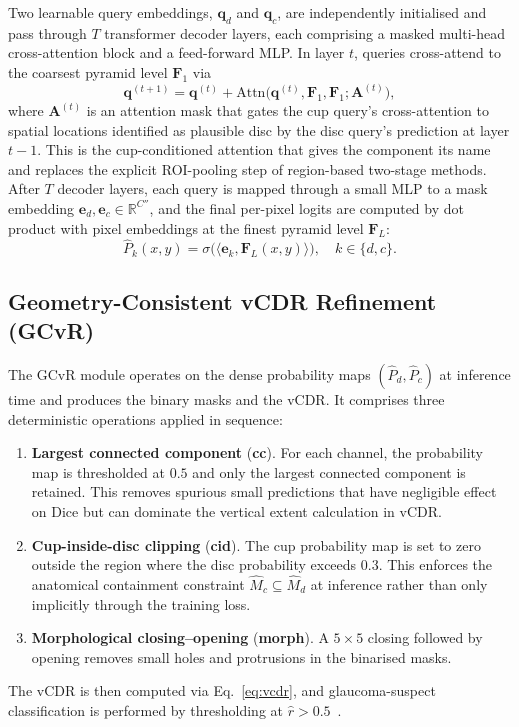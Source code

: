 \documentclass[10pt,journal,twocolumn]{IEEEtran}
\begin{document}
Two learnable query embeddings, $\mathbf{q}_d$ and $\mathbf{q}_c$, are independently initialised and pass through $T$ transformer decoder layers, each comprising a masked multi-head cross-attention block and a feed-forward MLP. In layer $t$, queries cross-attend to the coarsest pyramid level $\mathbf{F}_1$ via
\begin{equation}
\mathbf{q}^{(t+1)} = \mathbf{q}^{(t)} + \text{Attn}\big(\mathbf{q}^{(t)}, \mathbf{F}_1, \mathbf{F}_1; \mathbf{A}^{(t)}\big),
\end{equation}
where $\mathbf{A}^{(t)}$ is an attention mask that gates the cup query's cross-attention to spatial locations identified as plausible disc by the disc query's prediction at layer $t-1$. This is the cup-conditioned attention that gives the component its name and replaces the explicit ROI-pooling step of region-based two-stage methods. After $T$ decoder layers, each query is mapped through a small MLP to a mask embedding $\mathbf{e}_d, \mathbf{e}_c \in \mathbb{R}^{C''}$, and the final per-pixel logits are computed by dot product with pixel embeddings at the finest pyramid level $\mathbf{F}_L$:
\begin{equation}
\hat{P}_k(x,y) = \sigma\big(\langle \mathbf{e}_k, \mathbf{F}_L(x,y) \rangle\big), \quad k \in \{d, c\}.
\end{equation}

\subsection{Geometry-Consistent vCDR Refinement (GCvR)}

The GCvR module operates on the dense probability maps $(\hat{P}_d, \hat{P}_c)$ at inference time and produces the binary masks and the vCDR. It comprises three deterministic operations applied in sequence:
\begin{enumerate}
  \item \textbf{Largest connected component} (\textbf{cc}). For each channel, the probability map is thresholded at $0.5$ and only the largest connected component is retained. This removes spurious small predictions that have negligible effect on Dice but can dominate the vertical extent calculation in vCDR.
  \item \textbf{Cup-inside-disc clipping} (\textbf{cid}). The cup probability map is set to zero outside the region where the disc probability exceeds $0.3$. This enforces the anatomical containment constraint $\hat{M}_c \subseteq \hat{M}_d$ at inference rather than only implicitly through the training loss.
  \item \textbf{Morphological closing--opening} (\textbf{morph}). A $5\!\times\!5$ closing followed by opening removes small holes and protrusions in the binarised masks.
\end{enumerate}
The vCDR is then computed via Eq.~\eqref{eq:vcdr}, and glaucoma-suspect classification is performed by thresholding at $\hat{r} > 0.5$~\cite{li2023rdcnn}.
\end{document}

